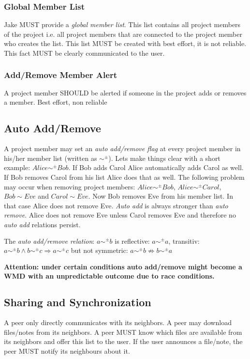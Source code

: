\subsubsection{Global Member List}
Jake MUST provide a \emph{global member list}. This list contains all project members of the project i.e. all project members that are connected to the project member who creates the list. This list MUST be created with best effort, it is not reliable. This fact MUST be clearly communicated  to the user. 

\subsubsection{Add/Remove Member Alert}
A project member SHOULD be alerted if someone in the project adds or removes a member. Best effort, non reliable

\subsection{Auto Add/Remove}
A project member may set an \emph{auto add/remove flag} at every project member in his/her member list (written as $\sim ^\pm$). Lets make things clear with a short example: $Alice \sim ^\pm Bob$. If Bob adds Carol Alice automatically adds Carol as well. If Bob removes Carol from his list Alice does that as well. The following problem may occur when removing project members: $Alice \sim ^\pm Bob$, $Alice \sim ^\pm  Carol$, $Bob \sim Eve$ and $Carol \sim Eve$. Now Bob removes Eve from his member list. In that case Alice does not remove Eve.
\emph{Auto add} is always stronger than \emph{auto remove}. Alice does not remove Eve unless Carol removes Eve and therefore no \emph{auto add} relations persist.

The \emph{auto add/remove relation}: $a \sim ^\pm b$ is reflective: $a \sim ^\pm a$, transitiv: $a \sim ^\pm b \wedge b\sim ^\pm c \Rightarrow a \sim ^\pm c$ but not symmetric: $a \sim ^\pm b \not\Rightarrow b \sim ^\pm a$

\textbf{Attention: under certain conditions auto add/remove might become a WMD with an unpredictable outcome due to race conditions.}


\subsection{Sharing and Synchronization}
A peer only directly communicates with its neighbors. A peer may download files/notes from its neighbors. A peer MUST know which files are available from its neighbors and offer this list to the user. If the user announces a file/note, the peer MUST notify its neighbours about it.

